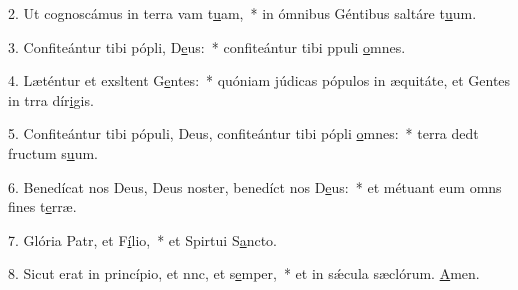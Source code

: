 2. Ut cognoscámus in terra vam t\uline{u}am,~* in ómnibus Géntibus saltáre t\uline{u}um.\par 
3. Confiteántur tibi pópli, D\uline{e}us:~* confiteántur tibi ppuli \uline{o}mnes.\par 
4. Læténtur et exsltent G\uline{e}ntes:~* quóniam júdicas pópulos in æquitáte, et Gentes in trra dír\uline{i}gis.\par 
5. Confiteántur tibi pópuli, Deus, confiteántur tibi pópli \uline{o}mnes:~* terra dedt fructum s\uline{u}um.\par 
6. Benedícat nos Deus, Deus noster, benedíct nos D\uline{e}us:~* et métuant eum omns fines t\uline{e}rræ.\par 
7. Glória Patr, et F\uline{í}lio,~* et Spirtui S\uline{a}ncto.\par 
8. Sicut erat in princípio, et nnc, et s\uline{e}mper,~* et in sǽcula sæclórum. \uline{A}men.\par 
